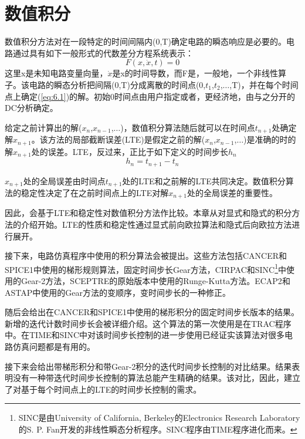 \chapter{数值积分}
\label{chap:6}
数值积分方法对在一段特定的时间间隔内(0,T)确定电路的瞬态响应是必要的。电路通过具有如下一般形式的代数差分方程系统表示：
\begin{equation}
    F(x,\dot{x},t) = 0
    \label{eq:6.1}
\end{equation}
这里x是未知电路变量向量，$\dot{x}$是x的时间导数，而F是，一般地，一个非线性算子。该电路的瞬态分析把间隔(0,T)分成离散的时间点(0,$t_1$,$t_2$,$\dots$,T)，并在每个时间点上确定(\ref{eq:6.1})的解。初始0时间点由用户指定或者，更经济地，由与之分开的DC分析确定。

给定之前计算出的解($x_n$,$x_{n-1}$,$\dots$)，数值积分算法随后就可以在时间点$t_{n+1}$处确定解$x_{n+1}$。该方法的局部截断误差(LTE)是假定之前的解($x_n$,$x_{n-1}$,$\dots$)是准确的时的解$x_{n+1}$处的误差。LTE，反过来，正比于如下定义的时间步长$h_n$
\begin{equation}
    h_n = t_{n+1} - t_n
    \label{eq:6.2}
\end{equation}

$x_{n+1}$处的全局误差由时间点$t_{n+1}$处的LTE和之前解的LTE共同决定。数值积分算法的稳定性决定了在之前时间点上的LTE对解$x_{n+1}$处的全局误差的重要性\cite{ref-63,ref-64,ref-65}。

因此，会基于LTE和稳定性对数值积分方法作比较。本章从对显式和隐式的积分方法的介绍开始。LTE的性质和稳定性通过显式前向欧拉算法和隐式后向欧拉方法进行展开。

接下来，电路仿真程序中使用的积分算法会被提出。这些方法包括CANCER\cite{ref-2}和SPICE1\cite{ref-1}中使用的梯形规则算法，固定时间步长Gear方法\cite{ref-66,ref-67}，CIRPAC\cite{ref-41}和SINC\footnote{SINC是由University of California, Berkeley的Electronics Research Laboratory的S. P. Fan开发的非线性瞬态分析程序。SINC程序由TIME程序\cite{ref-19}进化而来。}中使用的Gear-2方法，SCEPTRE\cite{ref-43}的原始版本中使用的Runge-Kutta方法。ECAP2\cite{ref-31,ref-32}和ASTAP\cite{ref-28,ref-29}中使用的Gear方法的变顺序，变时间步长的一种修正。

随后会给出在CANCER和SPICE1中使用的梯形积分的固定时间步长版本的结果。新增的迭代计数时间步长会被详细介绍。这个算法的第一次使用是在TRAC程序\cite{ref-39}中。在TIME\cite{ref-19}和SINC中对该时间步长控制的进一步使用已经证实该算法对很多电路仿真问题都是有用的。

接下来会给出带梯形积分和带Gear-2积分的迭代时间步长控制的对比结果。结果表明没有一种带迭代时间步长控制的算法总能产生精确的结果。该对比，因此，建立了对基于每个时间点上的LTE的时间步长控制的需求。

